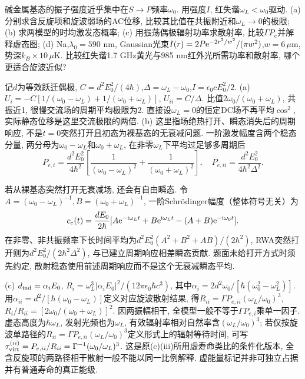 \begin{exercise}碱金属基态的振子强度近乎集中在$S\to P$频率$\omega_0$. 用强度$I$, 红失谐$\omega_L<\omega_0$驱动. (a) 分别求含反旋项和旋波弱场的AC位移, 比较其比值在共振附近和$\omega_L\to0$的极限; (b) 求两模型的时均激发态概率; (c) 用振荡偶极辐射功率求散射率, 比较$\Gamma P_e$并解释虚态图; (d) Na,$\lambda_0=590$ nm, Gaussian光束$I(r)=2P\mathrm e^{-2r^2/w^2}/(\pi w^2)$,$w=6\,\mu$m, 势深$k_B\times10\,\mu$K. 比较红失谐1.7 GHz黄光与985 nm红外光所需功率和散射率, 哪个更适合旋波近似?\end{exercise}
\begin{solution}记$d$为等效跃迁偶极, $C=d^2E_0^2/(4\hbar)$,$\Delta=\omega_L-\omega_0$,$I=\epsilon_0cE_0^2/2$. (a) $U_i=-C[1/(\omega_0-\omega_L)+1/(\omega_0+\omega_L)]$, $U_{ii}=C/\Delta$. 比值$2\omega_0/(\omega_0+\omega_L)$, 共振近1, 很慢交流场的周期平均极限为2. 直接设$\omega_L=0$的恒定DC场不再平均$\cos^2$, 实际静态位移是这里交流极限的两倍. (b) 这里指场绝热打开、瞬态消失后的周期响应, 不是$t=0$突然打开且初态为裸基态的无衰减问题. 一阶激发幅度含两个稳态分量, 两分母为$\omega_0-\omega_L$和$\omega_0+\omega_L$, 在非零$\omega_L$下平均过足够多周期后
\[P_{e,i}=\frac{d^2E_0^2}{4\hbar^2}\left[\frac1{(\omega_0-\omega_L)^2}+\frac1{(\omega_0+\omega_L)^2}\right],\quad P_{e,ii}=\frac{d^2E_0^2}{4\hbar^2\Delta^2}.\]

若从裸基态突然打开无衰减场, 还会有自由瞬态. 令$A=(\omega_0-\omega_L)^{-1},B=(\omega_0+\omega_L)^{-1}$, 一阶Schrödinger幅度（整体符号无关）为
\[c_e(t)=\frac{dE_0}{2\hbar}
 [A\mathrm e^{-\mathrm i\omega_Lt}+B\mathrm e^{\mathrm i\omega_Lt}-(A+B)\mathrm e^{-\mathrm i\omega_0t}].\]
在非零、非共振频率下长时间平均为$d^2E_0^2(A^2+B^2+AB)/(2\hbar^2)$, RWA突然打开则为$d^2E_0^2/(2\hbar^2\Delta^2)$, 与已建立周期响应相差瞬态贡献. 题面未给打开方式时须先约定, 散射稳态使用前述周期响应而不是这个无衰减瞬态平均.

(c) $d_{\rm ind}=\alpha_iE_0$, $R_i=\omega_L^3|\alpha_iE_0|^2/(12\pi\epsilon_0\hbar c^3)$, 其中$\alpha_i=2d^2\omega_0/[\hbar(\omega_0^2-\omega_L^2)]$. 用$\alpha_{ii}=d^2/[\hbar(\omega_0-\omega_L)]$定义对应旋波散射结果, 得$R_{ii}=\Gamma P_{e,ii}(\omega_L/\omega_0)^3$, $R_i/R_{ii}=[2\omega_0/(\omega_0+\omega_L)]^2$. 因两振幅相干, 全模型一般不等于$\Gamma P_{e,i}$乘单一因子. 虚态高度为$\hbar\omega_L$, 发射光频也为$\omega_L$, 有效辐射率相对自然率含$(\omega_L/\omega_0)^3$; 若仅按旋波单路径的$R_{ii}=\Gamma P_{e,ii}(\omega_L/\omega_0)^3$定义形式上的辐射等待时间, 可写$\tau_{\rm virt}^{(ii)}=P_{e,ii}/R_{ii}=\Gamma^{-1}(\omega_0/\omega_L)^3$. 这是原(c)(iii)所用虚寿命类比的条件化版本, 全含反旋项的两路径相干散射一般不能以同一比例解释. 虚能量标记并非可独立占据并有普通寿命的真正能级.



\end{solution}
